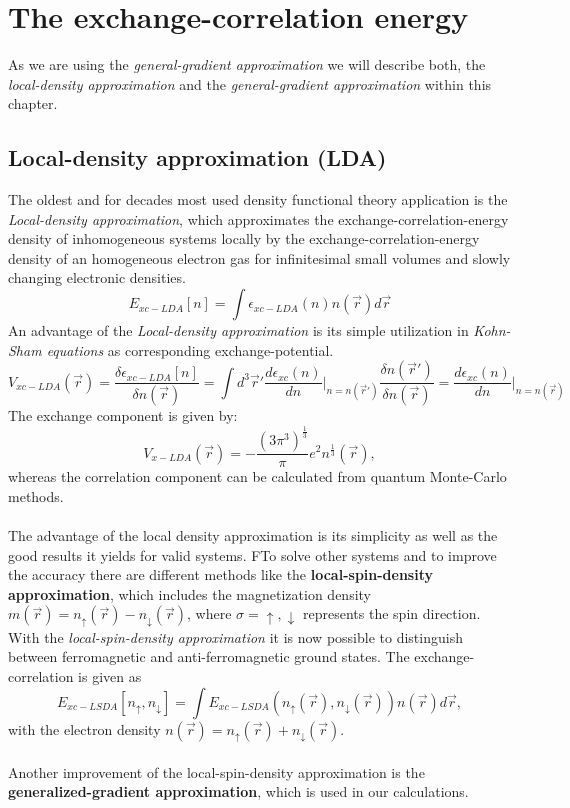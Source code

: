 	\section{The exchange-correlation energy}
	\label{sec:TheExchangeCorrelationEnergy}
		As we are using the \textit{general-gradient approximation} we will describe both, the \textit{local-density approximation} and the \textit{general-gradient approximation} within this chapter.
		\subsection{Local-density approximation (LDA)}
			The oldest and for decades most used density functional theory application is the \textit{Local-density approximation}, which approximates the exchange-correlation-energy density of inhomogeneous systems locally by the exchange-correlation-energy  density of an homogeneous electron gas for infinitesimal small volumes and slowly changing electronic densities. 
			\begin{equation}
				E_{xc-LDA}[n] = \int \epsilon_{xc-LDA}(n) n(\vec r) d \vec r
			\end{equation}
			An advantage of the \textit{Local-density approximation} is its simple utilization in \textit{Kohn-Sham equations} as corresponding exchange-potential.
			\begin{equation}
				V_{xc-LDA}(\vec r) = \frac{\delta \epsilon_{xc-LDA}[n]}{\delta n(\vec r)} = \int d^3 \vec r'\frac{d \epsilon_{xc}(n)}{dn}\big|_{n=n(\vec r')} \frac{\delta n(\vec r')}{\delta n(\vec r)} = \frac{d \epsilon_{xc} (n)}{d n}\big|_{n=n(\vec r)}
			\end{equation}
			The exchange component is given by:
			\begin{equation}
				V_{x-LDA} (\vec r) = - \frac{(3\pi^3)^\frac{1}{3}}{\pi}e^2n^\frac{1}{3}(\vec r),
			\end{equation}
			whereas the correlation component can be calculated from  quantum Monte-Carlo methods. \\\\
			The advantage of the local density approximation is its simplicity as well as the good  results it yields for valid systems. FTo solve other systems and to improve the accuracy there are different methods like the \textbf{local-spin-density approximation}, which includes the magnetization density $m(\vec r) = n_\uparrow (\vec r) - n_\downarrow (\vec r)$, where $\sigma = \uparrow, \downarrow$ represents the spin direction. With the \textit{local-spin-density approximation} it is now possible to distinguish between ferromagnetic and anti-ferromagnetic ground states. The exchange-correlation is given as
			\begin{equation}
				E_{xc-LSDA}[n_\uparrow, n_\downarrow] = \int E_{xc-LSDA}(n_\uparrow(\vec r), n_\downarrow(\vec r))n(\vec r)d \vec r,
			\end{equation}
			with the electron density $n(\vec r) = n_\uparrow (\vec r) + n_\downarrow (\vec r)$. \\\\
			Another improvement of the local-spin-density approximation is the \textbf{generalized-gradient approximation}, which is used in our calculations.
